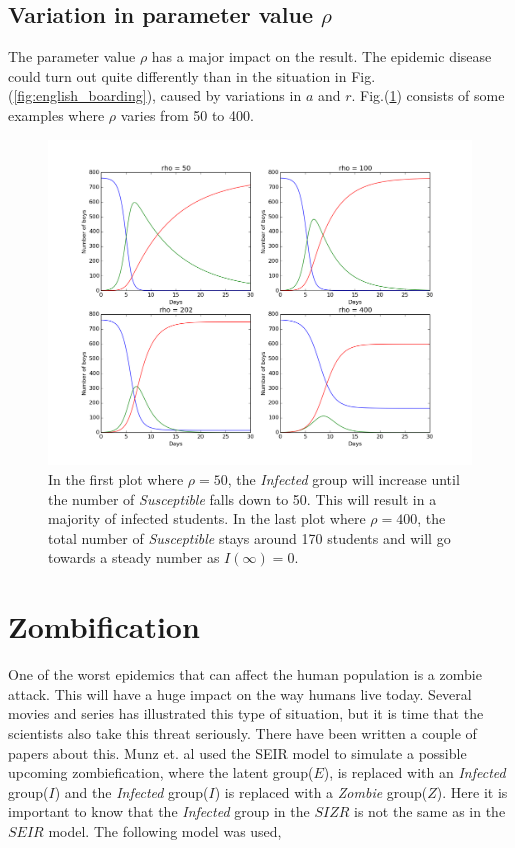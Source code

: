 \documentclass[%
twoside,                 %
final,                   %
chapterprefix=true,      %
open=right               %
10pt]{book}
\begin{document}
\subsection{Variation in parameter value $\rho$}
The parameter value $\rho$ has a major impact on the result. The epidemic disease could turn out quite differently than in the situation in Fig.(\ref{fig:english_boarding}), caused by variations in $a$ and $r$. Fig.(\ref{fig:rho_changes}) consists of some examples where $\rho$ varies from 50 to 400.


\begin{figure}[ht]
  \centerline{\includegraphics[width=0.9\linewidth]{1_fig/English_boarding_school_changes.png}}
  \caption{
  \label{fig:rho_changes} In the first plot where $\rho=50$, the \emph{Infected} group will increase until the number of \emph{Susceptible} falls down to 50. This will result in a majority of infected students. In the last plot where $\rho=400$, the total number of \emph{Susceptible} stays around 170 students and will go towards a steady number as $I(\infty)=0$.
  }
\end{figure}


\section{Zombification}
One of the worst epidemics that can affect the human population is a zombie attack. This will have a huge impact on the way humans live today. Several movies and series has illustrated this type of situation, but it is time that the scientists also take this threat seriously. There have been written a couple of papers about this. Munz et. al\cite{munz2009zombies} used the SEIR model to simulate a possible upcoming zombiefication, where the latent group($E$), is replaced with an \emph{Infected} group($I$) and the \emph{Infected} group($I$) is replaced with a \emph{Zombie} group($Z$). Here it is important to know that the \emph{Infected} group in the $SIZR$ is not the same as in the $SEIR$ model. The following model was used,
\end{document}
